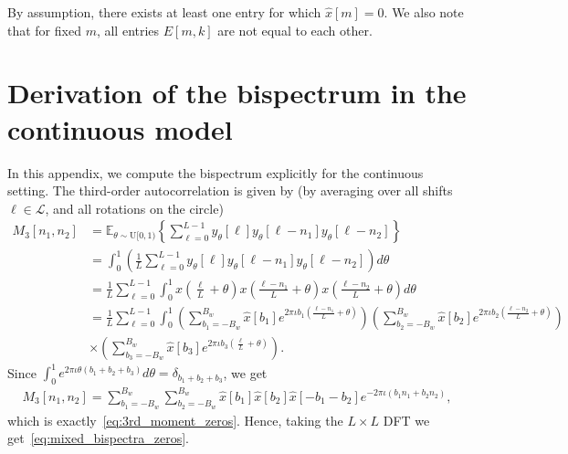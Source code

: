 \documentclass[english,12pt]{article}
\newcommand{\I}{\iota}
\newcommand{\C}{\mathbb{C}}
\newcommand{\tB}{B_w}
\newcommand{\hx}{\hat{x}}
\newcommand{\E}{\mathbb{E}}
\numberwithin{equation}{section}
\numberwithin{mytheorem}{section} %
\begin{document}
By assumption, there exists at least one entry for which
$\hx[m]=0$. We also note that for fixed $m$, all entries   
$E[m,k]$ are not equal to each other. 


\section{Derivation of the bispectrum in the continuous model} \label{sec:continuous_bispectrum}

In this appendix, we compute the bispectrum explicitly for the continuous setting. The third-order autocorrelation is given by (by averaging over all shifts $\ell\in\mathcal{L}$, and all rotations on the circle)
\begin{equation}
\begin{split}
M_3[n_1,n_2] &= \E_{\theta\sim\text{U}[0,1)}\left\{ \sum_{\ell=0}^{L-1}  y_\theta[\ell] y_\theta[\ell-n_1] y_\theta[\ell-n_2]\right\} 
\\&=\int_{0}^{1}\left(\frac{1}{L}\sum_{\ell=0}^{L-1} y_\theta[\ell] y_\theta[\ell-n_1] y_\theta[\ell-n_2]\right)d\theta\\ 
&= \frac{1}{L}\sum_{\ell=0}^{L-1}\int_{0}^{1} x\left(\frac{\ell}{L} + \theta\right) x\left(\frac{\ell-n_1}{L} + \theta\right)
x\left(\frac{\ell-n_2}{L} + \theta\right)d\theta\\
&= \frac{1}{L}\sum_{\ell=0}^{L-1}\int_{0}^{1} 
\left(\sum_{b_1=-\tB}^{\tB}\hat{x}[b_1]e^{2\pi\I b_1 \left(\frac{\ell-n_1}{L} + \theta\right) }\right) 
\left(\sum_{b_2=-\tB}^{\tB}\hat{x}[b_2]e^{2\pi\I b_2 \left(\frac{\ell-n_2}{L} + \theta\right) } \right) \\
&\times \left(\sum_{b_3=-\tB}^{\tB}\hat{x}[b_3]e^{2\pi\I b_3 \left(\frac{\ell}{L} + \theta\right) }\right). 
\end{split}
\end{equation}
Since $\int_{0}^{1}e^{2\pi\I\theta(b_1+b_2+b_3)}d\theta=\delta_{b_1+b_2+b_3}$, we get 
\begin{equation}
\begin{split}
M_3[n_1,n_2] =   \sum_{b_1=-\tB}^{\tB}\sum_{b_2=-\tB}^{\tB} \hat{x}[b_1]\hat{x}[b_2]\hat{x}[-b_1-b_2]e^{-2\pi\I (b_1n_1+b_2n_2)},
\end{split}
\end{equation}
which is exactly~\eqref{eq:3rd_moment_zeros}. Hence, taking the $L\times L$ DFT we get~\eqref{eq:mixed_bispectra_zeros}.
\end{document}
